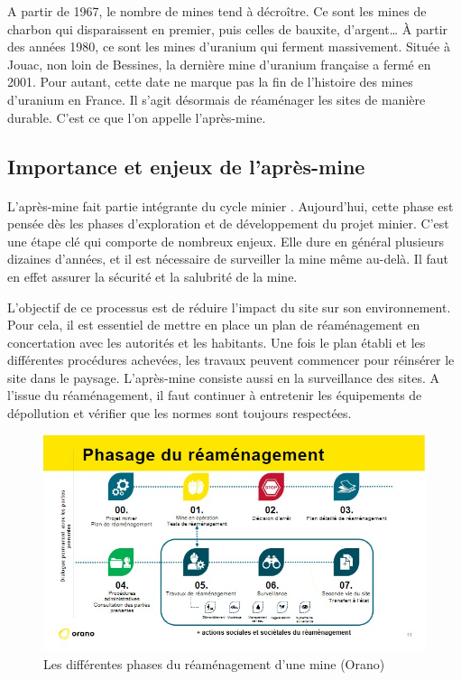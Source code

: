\documentclass{article}
\begin{document}
A partir de 1967, le nombre de mines tend à décroître. Ce sont les mines de charbon qui disparaissent en premier, puis celles de bauxite, d’argent… À partir des années 1980, ce sont les mines d’uranium qui ferment massivement. Située à Jouac, non loin de Bessines, la dernière mine d’uranium française a fermé en 2001. Pour autant, cette date ne marque pas la fin de l’histoire des mines d’uranium en France. Il s’agit désormais de réaménager les sites de manière durable. C’est ce que l’on appelle l’après-mine.



\subsection{Importance et enjeux de l'après-mine}
\paragraph{} L’après-mine fait partie intégrante du cycle minier \cite{himeur_apres-mine_2020}. Aujourd’hui, cette phase est pensée dès les phases d’exploration et de développement du projet minier. C’est une étape clé qui comporte de nombreux enjeux. Elle dure en général plusieurs dizaines d’années, et il est nécessaire de surveiller la mine même au-delà. Il faut en effet assurer la sécurité et la salubrité de la mine.

L’objectif de ce processus est de réduire l’impact du site sur son environnement. Pour cela, il est essentiel de mettre en place un plan de réaménagement en concertation avec les autorités et les habitants. Une fois le plan établi et les différentes procédures achevées, les travaux peuvent commencer pour réinsérer le site dans le paysage. L’après-mine consiste aussi en la surveillance des sites. A l’issue du réaménagement, il faut continuer à entretenir les équipements de dépollution et vérifier que les normes sont toujours respectées.


\begin{figure}[H]
    \centering
    \includegraphics[width=\linewidth]{I_B_1.jpg}
    \caption{Les différentes phases du réaménagement d'une mine (Orano)}
    \label{fig:phases_reamenagement}
\end{figure}
\end{document}
